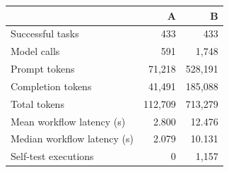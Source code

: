 \begin{tabular}{lrr}\toprule
 & A & B\\\midrule
Successful tasks & 433 & 433 \\
Model calls & 591 & 1,748 \\
Prompt tokens & 71,218 & 528,191 \\
Completion tokens & 41,491 & 185,088 \\
Total tokens & 112,709 & 713,279 \\
Mean workflow latency (s) & 2.800 & 12.476 \\
Median workflow latency (s) & 2.079 & 10.131 \\
Self-test executions & 0 & 1,157 \\
\bottomrule\end{tabular}
